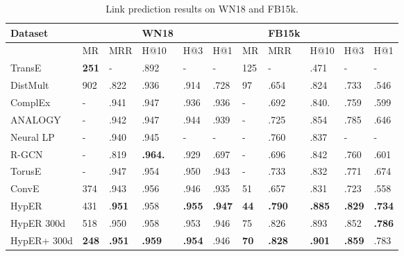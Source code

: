 \begin{table}[H]
\caption{Link prediction results on WN18 and FB15k.}
\centering
\begin{tabular}{lllllllllll}
  \textbf{Dataset} & & &  \textbf{WN18} & & & & \textbf{FB15k} \\
  \hline 
                    	& MR    		& MRR    		& H@10		& H@3    		& H@1    		& MR    		& MRR    		& H@10     	& H@3     		& H@1 \\
  \hline
  TransE       	& \textbf{251}   	& -           		& .892       	& -            		& -           		& 125    		& -          		& .471         	& -            		& - \\
  DistMult      	& 902  		& .822      		& .936      		& .914       	& .728     		& 97      		& .654     		& .824        	& .733       	& .546 \\
  ComplEx    	& -       		& .941      		& .947     		& .936       	& .936     		& -        		& .692      		& .840.       	& .759       	& .599 \\
  ANALOGY  	& -      		& .942       	& .947      		& .944       	& .939    		& -         		& .725     		& .854         	& .785       	& .646 \\
  Neural LP   	& -       		& .940      		& .945      		& -             	& -          		& -        		& .760      		& .837         	& -             	& - \\
  R-GCN       	& -       		& .819      		& \textbf{.964.} 	& .929       	& .697     		& -        		& .696      		& .842         	& .760       	& .601 \\
  TorusE        	& -       		& .947      		& .954      		& .950       	& .943     		& -        		& .733      		& .832        	& .771       	& .674 \\
  ConvE        	& 374   		& .943     		& .956      		& .946       	& .935     		& 51      		& .657      		& .831        	& .723       	& .558 \\
  HypER       	& 431   		& .\textbf{951}   & .958      		& \textbf{.955}  	& \textbf{.947}  	& \textbf{44}     	& \textbf{.790}  	& \textbf{.885}  	& \textbf{.829}  	& \textbf{.734} \\
  \hline
  HypER 300d 	& 518 		& .950    		& .958      		& .953        	& .946     		& 75      		& .826      		& .893       	& .852        	& \textbf{.786} \\
  HypER+ 300d	& \textbf{248} 	& \textbf{.951}  	& \textbf{.959}  	& \textbf{.954}  	& .946     		& \textbf{70}     	& \textbf{.828}  	& \textbf{.901}  	& \textbf{.859}   & .783

\end{tabular}
\end{table}

